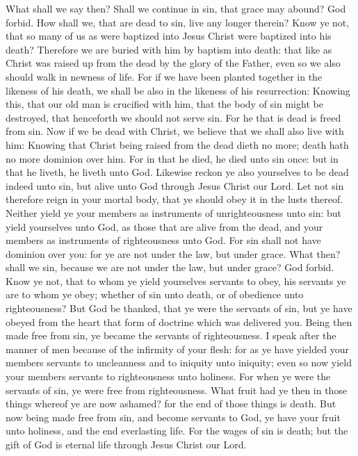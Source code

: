  What shall we say then? Shall we continue in sin, that
grace may abound?  God forbid. How shall we, that are dead
to sin, live any longer therein?  Know ye not, that so
many of us as were baptized into Jesus Christ were baptized into his
death?  Therefore we are buried with him by baptism into
death: that like as Christ was raised up from the dead by the glory of
the Father, even so we also should walk in newness of life.
 For if we have been planted together in the likeness of
his death, we shall be also in the likeness of his resurrection:
 Knowing this, that our old man is crucified with him,
that the body of sin might be destroyed, that henceforth we should not
serve sin.  For he that is dead is freed from sin.
 Now if we be dead with Christ, we believe that we shall
also live with him:  Knowing that Christ being raised from
the dead dieth no more; death hath no more dominion over him.
 For in that he died, he died unto sin once: but in that
he liveth, he liveth unto God.  Likewise reckon ye also
yourselves to be dead indeed unto sin, but alive unto God through Jesus
Christ our Lord.  Let not sin therefore reign in your
mortal body, that ye should obey it in the lusts thereof.
 Neither yield ye your members as instruments of
unrighteousness unto sin: but yield yourselves unto God, as those that
are alive from the dead, and your members as instruments of
righteousness unto God.  For sin shall not have dominion
over you: for ye are not under the law, but under grace. 
What then? shall we sin, because we are not under the law, but under
grace? God forbid.  Know ye not, that to whom ye yield
yourselves servants to obey, his servants ye are to whom ye obey;
whether of sin unto death, or of obedience unto righteousness?
 But God be thanked, that ye were the servants of sin,
but ye have obeyed from the heart that form of doctrine which was
delivered you.  Being then made free from sin, ye became
the servants of righteousness.  I speak after the manner
of men because of the infirmity of your flesh: for as ye have yielded
your members servants to uncleanness and to iniquity unto iniquity; even
so now yield your members servants to righteousness unto holiness.
 For when ye were the servants of sin, ye were free from
righteousness.  What fruit had ye then in those things
whereof ye are now ashamed? for the end of those things is death.
 But now being made free from sin, and become servants to
God, ye have your fruit unto holiness, and the end everlasting life.
 For the wages of sin is death; but the gift of God is
eternal life through Jesus Christ our Lord.


